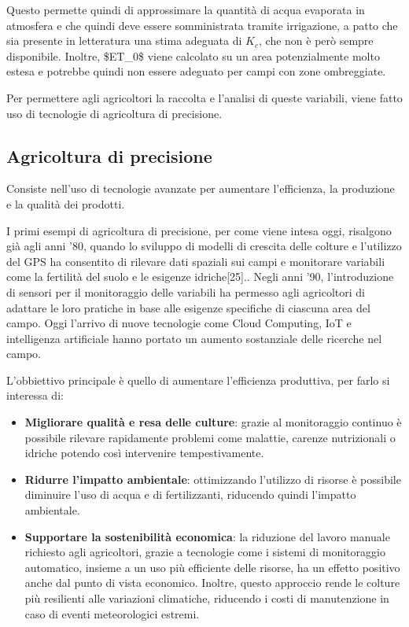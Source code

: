\documentclass[12pt,a4paper,openright,twoside, openany]{book}
\begin{document}
Questo permette quindi di approssimare la quantità di acqua evaporata in atmosfera e che quindi deve essere somministrata tramite irrigazione, a patto che sia presente in letteratura una stima adeguata di $K_c$, che non è però sempre disponibile. Inoltre, \ac{$ET_0$} viene calcolato su un area potenzialmente molto estesa e potrebbe quindi non essere adeguato per campi con zone ombreggiate.

Per permettere agli agricoltori la raccolta e l'analisi di queste variabili, viene fatto uso di  tecnologie di agricoltura di precisione.

\subsection{Agricoltura di precisione}\label{agricoltura-precisione-tipi}

Consiste nell'uso di tecnologie avanzate per aumentare l'efficienza, la produzione e la qualità dei prodotti\cite{ZHANG2002113}.

I primi esempi di agricoltura di precisione, per come viene intesa oggi, risalgono già agli anni '80, quando lo sviluppo di modelli di crescita delle colture e l'utilizzo del \ac{GPS} ha consentito di rilevare dati spaziali sui campi e monitorare variabili come la fertilità del suolo e le esigenze idriche[25].\cite{201402720190101}.
Negli anni '90, l'introduzione di sensori per il monitoraggio delle variabili ha permesso agli agricoltori di adattare le loro pratiche in base alle esigenze specifiche di ciascuna area del campo\cite{201402720190101}.
Oggi l'arrivo di nuove tecnologie come Cloud Computing, \ac{IoT} e intelligenza artificiale hanno portato un aumento sostanziale delle ricerche nel campo\cite{WOLFERT201769}.

L'obbiettivo principale è quello di aumentare l'efficienza produttiva, per farlo si interessa di:
\begin{itemize}[noitemsep]
    \item \textbf{Migliorare qualità e resa delle culture}: grazie al monitoraggio continuo è possibile rilevare rapidamente problemi come malattie, carenze nutrizionali o idriche potendo così intervenire tempestivamente.
    \item \textbf{Ridurre l'impatto ambientale}: ottimizzando l'utilizzo di risorse è possibile diminuire l'uso di acqua e di fertilizzanti, riducendo quindi l'impatto ambientale.
    \item \textbf{Supportare la sostenibilità economica}: la riduzione del lavoro manuale richiesto agli agricoltori, grazie a tecnologie come i sistemi di monitoraggio automatico, insieme a un uso più efficiente delle risorse, ha un effetto positivo anche dal punto di vista economico. Inoltre, questo approccio rende le colture più resilienti alle variazioni climatiche, riducendo i costi di manutenzione in caso di eventi meteorologici estremi.
\end{itemize}
\end{document}
